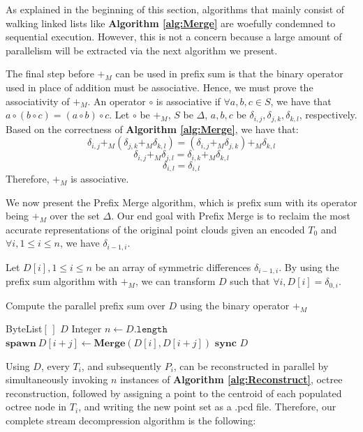 \documentclass[twoside,twocolumn]{article}
\begin{document}
As explained in the beginning of this section, algorithms that mainly consist of walking linked lists like
\textbf{Algorithm \ref{alg:Merge}} are woefully condemned to sequential execution. However, this is
not a concern because a large amount of parallelism will be extracted via the next algorithm we present.

The final step before $+_M$ can be used in prefix sum is that the binary operator used in place of
addition must be associative. Hence, we must prove the associativity of $+_M$. An operator $\circ$ is
associative if $\forall a, b, c \in S$, we have that $a \circ (b \circ c) = (a \circ b) \circ c$. Let
$\circ$ be $+_M$, $S$ be $\Delta$, $a,b,c$ be $\delta_{i,j}, \delta_{j,k}, \delta_{k,l}$, respectively.
Based on the correctness of \textbf{Algorithm \ref{alg:Merge}}, we have that:
$$\delta_{i,j} +_M (\delta_{j,k} +_M \delta_{k,l}) = (\delta_{i,j} +_M \delta_{j,k}) +_M \delta_{k,l}$$
$$\delta_{i,j} +_M \delta_{j,l} = \delta_{i,k} +_M \delta_{k,l}$$
$$\delta_{i,l} = \delta_{i,l}$$
Therefore, $+_M$ is associative.

We now present the Prefix Merge algorithm, which is prefix sum with its operator being $+_M$ over the set
$\Delta$. Our end goal with Prefix Merge is to reclaim the most accurate representations of the original
point clouds given an encoded $T_0$ and $\forall i, 1 \leq i \leq n$, we have $\delta_{i-1, i}$.

Let $D[i], 1 \leq i \leq n$ be an array of symmetric differences $\delta_{i-1, i}$. By using the prefix
sum algorithm with $+_M$, we can transform $D$ such that $\forall i, D[i] = \delta_{0, i}$.

\begin{algorithm}[h]
\small
\caption{Compute the parallel prefix sum over $D$ using the binary operator $+_M$}
\label{alg:PrefixMerge}
\begin{algorithmic}[1]
 {ByteList$[\,]$ $D$}
  \State Integer $n \gets D.\mathtt{length}$
        \State $\mathbf{spawn} \ D[i + j] \gets \mathbf{Merge}(D[i], D[i + j])$
      \EndFor
    \EndFor
    \State $\mathbf{sync}$
  \EndFor
  \State \Return $D$
\EndProcedure
\Statex
\end{algorithmic}
\vspace{-0.4cm}
\end{algorithm}

Using $D$, every $T_i$, and subsequently $P_i$, can be reconstructed in parallel by simultaneously invoking
$n$ instances of \textbf{Algorithm \ref{alg:Reconstruct}}, octree reconstruction, followed by assigning a
point to the centroid of each populated octree node in $T_i$, and writing the new point set as a .pcd file.
Therefore, our complete stream decompression algorithm is the following:
\end{document}
